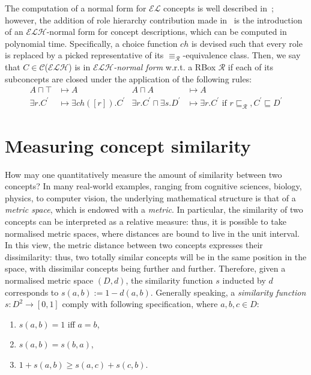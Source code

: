 \documentclass[]{llncs}
\newcommand{\el}{\(\mathcal{EL}{}\)}
\newcommand{\elh}{\(\mathcal{ELH}{}\)}
\newcommand{\subsume}[1]{\sqsubseteq_{\mathcal{#1}}}
\begin{document}
  The computation of a normal form for \el{} concepts is well described in~\cite{DLbook}; however, the addition of role hierarchy contribution made in~\cite{LeTu12} is the introduction of an \elh-normal form for concept descriptions, which can be computed in polynomial time.
  Specifically, a choice function \(ch{}\) is devised such that every role is replaced by a picked representative of its \(\equiv_\mathcal{R}\)-equivalence class.
  Then, we say that \(C \in \mathcal{C}\)(\elh) is in \emph{\elh-normal form} w.r.t. a RBox \(\mathcal{R}\) if each of its subconcepts are closed under the application of the following rules:
  \begin{align*}
    A \sqcap \top &\mapsto A & A \sqcap A &\mapsto A \tag{1--2}\\
    \exists{}r.C^\prime &\mapsto \exists{}ch([r]).C^\prime &
    \exists{}r.C^\prime \sqcap \exists{}s.D^\prime &\mapsto
    \exists{}r.C^\prime\,\,\text{if}\,\,r\subsume{R}, C^\prime \sqsubseteq D^\prime \tag{3--4}
  \end{align*}

  \section{Measuring concept similarity}

  How may one quantitatively measure the amount of similarity between two concepts?
  In many real-world examples, ranging from cognitive sciences, biology, physics, to computer vision, the underlying mathematical structure is that of a \emph{metric space}, which is endowed with a \emph{metric}.
  In particular, the similarity of two concepts can be interpreted as a relative measure: thus, it is possible to take normalised metric spaces, where distances are bound to live in the unit interval.
  In this view, the metric distance between two concepts expresses their dissimilarity: thus, two totally similar concepts will be in the same position in the space, with dissimilar concepts being further and further.
  Therefore, given a normalised metric space \((D,d)\), the similarity function \(s\) inducted by \(d\) corresponds to \(s(a,b) := 1 - d(a,b)\).
  Generally speaking, a \emph{similarity function} \(s \colon D^2 \to [0,1]\) comply with following specification, where \(a,b,c \in D\):
  \begin{enumerate}
    \item \(s(a,b) = 1\) iff \(a = b\),
    \item \(s(a,b) = s(b,a)\),
    \item \(1 + s(a,b) \ge s(a,c) + s(c,b)\).
  \end{enumerate}
\end{document}
